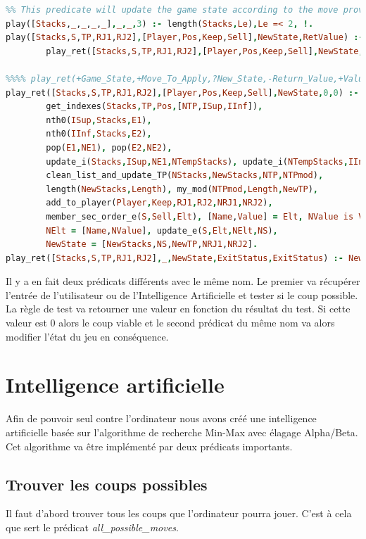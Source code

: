 \documentclass[a4paper, 11pt,twoside, leqno]{report}
\theoremstyle{plain}
\begin{document}
\begin{lstlisting}[language=prolog]
%%%% play(+Game_State,+Move_To_Apply,?New_State,-Return_Value)
%% This predicate will update the game state according to the move provided to the function.
play([Stacks,_,_,_,_],_,_,3) :- length(Stacks,Le),Le =< 2, !.
play([Stacks,S,TP,RJ1,RJ2],[Player,Pos,Keep,Sell],NewState,RetValue) :- length(Stacks,Le),Le > 2,is_possible(Stacks,TP,[Player,Pos,Keep,Sell],ExitStatus),
		play_ret([Stacks,S,TP,RJ1,RJ2],[Player,Pos,Keep,Sell],NewState,RetValue,ExitStatus).

%%%% play_ret(+Game_State,+Move_To_Apply,?New_State,-Return_Value,+Value_Returned_By_The_is_possible_Predicate)
play_ret([Stacks,S,TP,RJ1,RJ2],[Player,Pos,Keep,Sell],NewState,0,0) :- !,
		get_indexes(Stacks,TP,Pos,[NTP,ISup,IInf]),
		nth0(ISup,Stacks,E1),
		nth0(IInf,Stacks,E2),
		pop(E1,NE1), pop(E2,NE2),
		update_i(Stacks,ISup,NE1,NTempStacks), update_i(NTempStacks,IInf,NE2,NStacks),
		clean_list_and_update_TP(NStacks,NewStacks,NTP,NTPmod), 
		length(NewStacks,Length), my_mod(NTPmod,Length,NewTP), 
		add_to_player(Player,Keep,RJ1,RJ2,NRJ1,NRJ2),
		member_sec_order_e(S,Sell,Elt), [Name,Value] = Elt, NValue is Value - 1,
		NElt = [Name,NValue], update_e(S,Elt,NElt,NS), 
		NewState = [NewStacks,NS,NewTP,NRJ1,NRJ2].
play_ret([Stacks,S,TP,RJ1,RJ2],_,NewState,ExitStatus,ExitStatus) :- NewState =[Stacks,S,TP,RJ1,RJ2].
\end{lstlisting}

Il y a en fait deux prédicats différents avec le même nom. Le premier va récupérer l'entrée de l'utilisateur ou de l'Intelligence Artificielle et tester si le coup possible. La règle de test va retourner une valeur en fonction du résultat du test. Si cette valeur est 0 alors le coup viable et le second prédicat du même nom va alors modifier l'état du jeu en conséquence.

\section{Intelligence artificielle}

Afin de pouvoir seul contre l'ordinateur nous avons créé une intelligence artificielle basée sur l'algorithme de recherche Min-Max avec élagage Alpha/Beta. Cet algorithme va être implémenté par deux prédicats importants.

\subsection{Trouver les coups possibles}
Il faut d'abord trouver tous les coups que l'ordinateur pourra jouer. C'est à cela que sert le prédicat \textit{all\_{}possible\_{}moves}.
\end{document}
